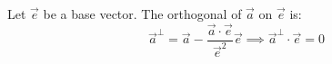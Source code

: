 \documentclass[aps,12pt]{revtex4}
\begin{document}
 
Let $\vec{e}$ be a base vector. The orthogonal of $\vec a$ on $\vec e$ is:
\begin{equation}
	\vec a ^\perp = \vec a - \dfrac{\vec a \cdot \vec e}{\vec e^2} \vec e \implies \vec a ^\perp \cdot \vec e = 0
\end{equation}
\end{document}
